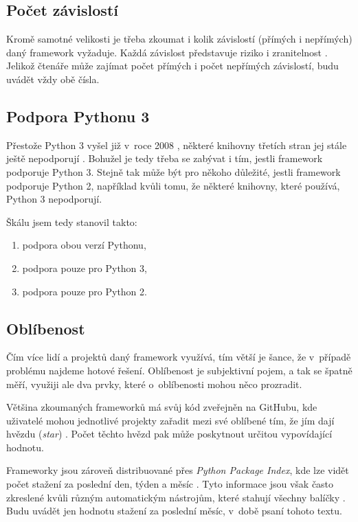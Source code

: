 \subsection{Počet závislostí}\label{poux10det-zuxe1vislostuxed}

Kromě samotné velikosti je třeba zkoumat i kolik závislostí (přímých i nepřímých) daný framework vyžaduje. Každá závislost představuje riziko i zranitelnost \autocite{dependencies}. Jelikož čtenáře může zajímat počet přímých i počet nepřímých závislostí, budu uvádět vždy obě čísla.

\subsection{Podpora Pythonu 3}\label{podpora-pythonu-3}

Přestože Python 3 vyšel již v~roce 2008 \autocite{py3year}, některé knihovny třetích stran jej stále ještě nepodporují \autocite{py3ready}. Bohužel je tedy třeba se zabývat i tím, jestli framework podporuje Python 3. Stejně tak může být pro někoho důležité, jestli framework podporuje Python 2, například kvůli tomu, že některé knihovny, které používá, Python 3 nepodporují.

Škálu jsem tedy stanovil takto:

\begin{enumerate}
\def\labelenumi{\arabic{enumi}.}
\tightlist
\item
  podpora obou verzí Pythonu,
\item
  podpora pouze pro Python 3,
\item
  podpora pouze pro Python 2.
\end{enumerate}

\subsection{Oblíbenost}\label{obluxedbenost}

Čím více lidí a projektů daný framework využívá, tím větší je šance, že v~případě problému najdeme hotové řešení. Oblíbenost je subjektivní pojem, a tak se špatně měří, využiji ale dva prvky, které o~oblíbenosti mohou něco prozradit.

Většina zkoumaných frameworků má svůj kód zveřejněn na GitHubu, kde uživatelé mohou jednotlivé projekty zařadit mezi své oblíbené tím, že jím dají hvězdu (\emph{star}) \autocite{ghstars}. Počet těchto hvězd pak může poskytnout určitou vypovídající hodnotu.

Frameworky jsou zároveň distribuované přes \emph{Python Package Index}, kde lze vidět počet stažení za poslední den, týden a měsíc \autocite{pypi}. Tyto informace jsou však často zkreslené kvůli různým automatickým nástrojům, které stahují všechny balíčky \autocite{pypibad}. Budu uvádět jen hodnotu stažení za poslední měsíc, v~době psaní tohoto textu.

